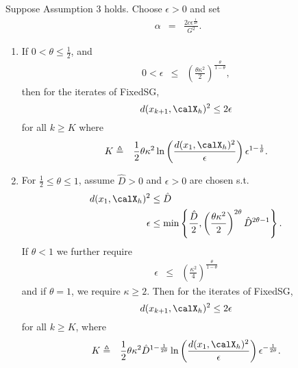   \begin{theorem}\label{ThmFixIterComp}
Suppose Assumption 3 holds. Choose $\epsilon>0$ and set 
\begin{eqnarray}
\label{stepsizeFixed}
   \alpha&=&\frac{2c\epsilon^{\frac{1}{2\theta}}}{G^2}.
\end{eqnarray}
  \begin{enumerate}
  \item If $0<\theta\leq\frac{1}{2}$, and
   \begin{eqnarray}\label{epsbound}
   0<\epsilon&\leq&\left(\frac{\theta \kappa^2}{2}\right)^{\frac{\theta}{1-\theta}},
   \end{eqnarray}
     then for the iterates of FixedSG,
      $$d(x_{k+1},\calX_h)^2\leq 2\epsilon$$ for all $k\geq K$ where 
   \begin{eqnarray}
  K&\triangleq& 
  \frac{1}{2}\theta \kappa^2 \ln\left(\frac{d(x_1,\calX_h)^2}{\epsilon}\right)\epsilon^{1-\frac{1}{\theta}}
.\nonumber
 \end{eqnarray}
   \item For $\frac{1}{2}\leq \theta\leq 1$, assume $\hat{D}>0$ and $\epsilon>0$ are chosen s.t. 
   \begin{align}\label{DinitBound}
  d(x_1,\calX_h)^2 &\leq \hat{D}
  \\
\epsilon&\leq\min
\left\{\frac{\hat{D}}{2},\left(\frac{\theta \kappa^2}{2}\right)^{2\theta}\hat{D}^{2\theta-1}
\right\}.
\label{Dbound}
    \end{align} 
If $\theta<1$ we further require
\begin{eqnarray} 
         \label{epsBound2}
  \epsilon &\leq&\left(\frac{\kappa^2}{4}\right)^{\frac{\theta}{1-\theta}}
   \end{eqnarray}
  and if $\theta=1$, we require $\kappa\geq 2$. Then
for the iterates of FixedSG, 
$$d(x_{k+1},\calX_h)^2\leq 2\epsilon$$ for all $k\geq K$, where
   \begin{eqnarray}
    \label{requiredK}
       K &\triangleq& 
       \frac{1}{2}\theta\kappa^2 \hat{D}^{1-\frac{1}{2\theta}} \ln\left(\frac{d(x_1,\calX_h)^2}{\epsilon}\right)\epsilon^{-\frac{1}{2\theta}}.
   \end{eqnarray}
  \end{enumerate}
  \end{theorem}
  

